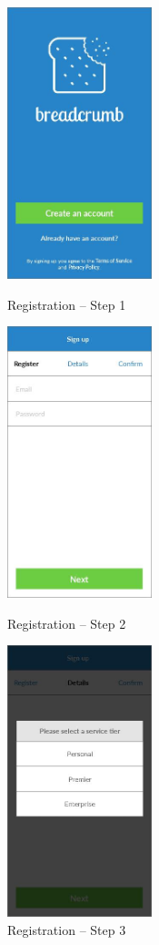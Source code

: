 \begin{figure}
  \subfigures
  \centering
  \begin{minipage}{4.6cm}
    \centering
    \includegraphics[width=4.2cm]{inc/ui_reg_step1.jpg}
    \caption{Registration -- Step 1}
    \label{fig:ui_reg_step1}
  \end{minipage}
  \begin{minipage}{4.6cm}
    \centering
    \includegraphics[width=4.2cm]{inc/ui_reg_step2.jpg}
    \caption{Registration -- Step 2}
    \label{fig:ui_reg_step2}
  \end{minipage}
  \begin{minipage}{4.6cm}
    \centering
    \includegraphics[width=4.2cm]{inc/ui_reg_step3.jpg}
    \caption{Registration -- Step 3}
    \label{fig:ui_reg_step3}
  \end{minipage}
\end{figure}


